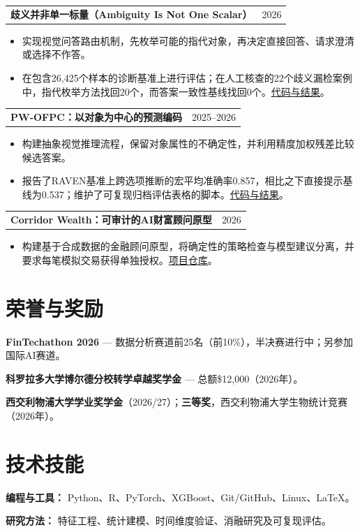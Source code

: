 \documentclass[10pt,letterpaper]{article}
\makeatletter
\newcommand{\entry}[2]{%
  \begin{tabularx}{\textwidth}{@{}>{\raggedright\arraybackslash}X@{\hspace{12pt}}r@{}}
    \textbf{#1} & {\fontsize{9.5}{11.5}\selectfont\color{muted}#2}
  \end{tabularx}}
\newcommand{\projectgap}{\vspace{6pt}}
\newcommand{\cvlink}[2]{\href{#1}{\underline{#2}}}
\makeatother
\begin{document}
\projectgap
\entry{歧义并非单一标量（Ambiguity Is Not One Scalar）}{2026}
\begin{itemize}
  \item 实现视觉问答路由机制，先枚举可能的指代对象，再决定直接回答、请求澄清或选择不作答。
  \item 在包含26,425个样本的诊断基准上进行评估；在人工核查的22个歧义漏检案例中，指代枚举方法找回20个，而答案一致性基线找回0个。\cvlink{https://github.com/pzy54154631-hub/ambiguity-is-not-one-scalar}{代码与结果}。
\end{itemize}

\projectgap
\entry{PW-OFPC：以对象为中心的预测编码}{2025--2026}
\begin{itemize}
  \item 构建抽象视觉推理流程，保留对象属性的不确定性，并利用精度加权残差比较候选答案。
  \item 报告了RAVEN基准上跨选项推断的宏平均准确率0.857，相比之下直接提示基线为0.537；维护了可复现归档评估表格的脚本。\cvlink{https://github.com/pzy54154631-hub/pw-ofpc}{代码与结果}。
\end{itemize}

\projectgap
\entry{Corridor Wealth：可审计的AI财富顾问原型}{2026}
\begin{itemize}
  \item 构建基于合成数据的金融顾问原型，将确定性的策略检查与模型建议分离，并要求每笔模拟交易获得单独授权。\cvlink{https://github.com/pzy54154631-hub/Shenzhen-Fintech-international-Project}{项目仓库}。
\end{itemize}

\section*{荣誉与奖励}
\textbf{FinTechathon 2026} --- 数据分析赛道前25名（前10\%），半决赛进行中；另参加国际AI赛道。\par
\vspace{4pt}
\textbf{科罗拉多大学博尔德分校转学卓越奖学金} --- 总额\$12,000（2026年）。\par
\vspace{4pt}
\textbf{西交利物浦大学学业奖学金}（2026/27）；\textbf{三等奖}，西交利物浦大学生物统计竞赛（2026年）。\par

\section*{技术技能}
\textbf{编程与工具：} Python、R、PyTorch、XGBoost、Git/GitHub、Linux、LaTeX。\par
\vspace{4pt}
\textbf{研究方法：} 特征工程、统计建模、时间维度验证、消融研究及可复现评估。
\end{document}
